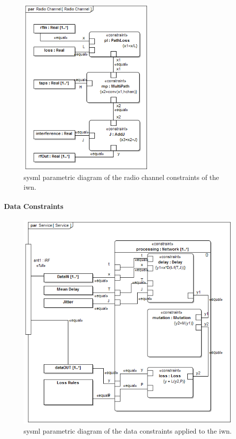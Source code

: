 \begin{figure}[tbp]
	\centering
	\includegraphics[width=0.6\textwidth]{./chapter-sysml/diagrams/par__Radio_Channel__Radio_Channel}%
	\caption{\gls{sysml} parametric diagram of the radio channel constraints of the \gls{iwn}.}%
	\label{sysml:fig:par:iwn-radio}
\end{figure} 

\paragraph{Data Constraints}\label{sysml:sec:constraints:data}

\begin{figure}[tbp]
	\centering
	\includegraphics[width=0.8\columnwidth]{./chapter-sysml/diagrams/par__Service__Service}%
	\caption{\gls{sysml} parametric diagram of the data constraints applied to the \gls{iwn}.}%
	\label{sysml:fig:par:iwn:data}
\end{figure}    

